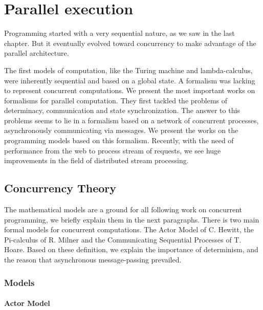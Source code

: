 \section{Parallel execution} \label{chapter3:parallel-execution}

Programming started with a very sequential nature, as we saw in the last chapter.
But it eventually evolved toward concurrency to make advantage of the parallel architecture.

The first models of computation, like the Turing machine and lambda-calculus, were inherently sequential and based on a global state.
A formalism was lacking to represent concurrent computations.
We present the most important works on formalisms for parallel computation.
They first tackled the problems of determinacy, communication and state synchronization.
The answer to this problems seems to lie in a formalism based on a network of concurrent processes, asynchronously communicating via messages.
We present the works on the programming models based on this formalism.
Recently, with the need of performance from the web to process stream of requests, we see huge improvements in the field of distributed stream processing.

\subsection{Concurrency Theory} \label{chapter3:parallel-execution:concurrency-theory}

The mathematical models are a ground for all following work on concurrent programming, we briefly explain them in the next paragraphs.
There is two main formal models for concurrent computations.
The Actor Model of C. Hewitt, the Pi-calculus of R. Milner and the Communicating Sequential Processes of T. Hoare.
Based on these definition, we explain the importance of determinism, and the reason that asynchronous message-passing prevailed.



\subsubsection{Models}

\paragraph{Actor Model}

